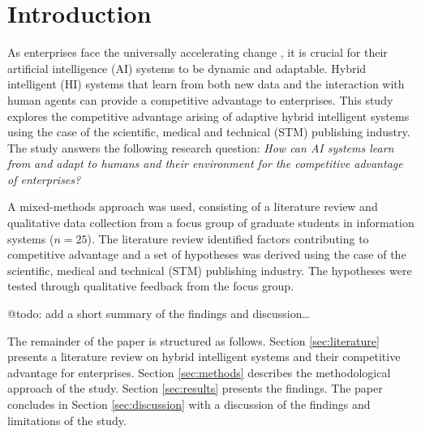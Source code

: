 \section{Introduction}
\label{sec:introduction}

As enterprises face the universally accelerating change \citep{eliazarUniversalityAcceleratingChange2018}, it
is crucial for their artificial intelligence (AI) systems to be dynamic and adaptable. Hybrid intelligent (HI)
systems that learn from both new data and the interaction with human agents can provide a competitive advantage
to enterprises. This study explores the competitive advantage arising of adaptive hybrid intelligent systems
using the case of the scientific, medical and technical (STM) publishing industry. The study answers the
following research question: \textit{How can AI systems learn from and adapt to humans and their environment
for the competitive advantage of enterprises?}

A mixed-methods approach was used, consisting of a literature review and qualitative data collection from
a focus group of graduate students in information systems ($n = 25$). The literature review identified factors
contributing to competitive advantage and a set of hypotheses was derived using the case of the scientific,
medical and technical (STM) publishing industry. The hypotheses were tested through qualitative feedback
from the focus group.

{\color{purple} @todo: add a short summary of the findings and discussion\dots}

The remainder of the paper is structured as follows. Section \ref{sec:literature} presents a literature review
on hybrid intelligent systems and their competitive advantage for enterprises. Section \ref{sec:methods} describes
the methodological approach of the study. Section \ref{sec:results} presents the findings. The paper concludes in
Section \ref{sec:discussion} with a discussion of the findings and limitations of the study.
